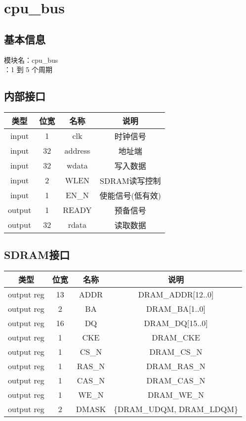 \section{cpu\_bus}
\subsection{基本信息}
模块名：cpu\_bus\\
：1 到 5 个周期
\subsection{内部接口}
\begin{tabular}{|c|c|c|c|}
    \hline
    类型        &   位宽    &   名称    &   说明\\\hline
    input       &   1      &    clk     &   时钟信号\\\hline
    input       &   32     &    address &   地址端\\\hline
    input       &   32      &   wdata   &   写入数据\\\hline
    input       &   2       &   WLEN    &   SDRAM读写控制\\\hline
    input       &   1       &   EN\_N   &   使能信号(低有效)\\\hline
    output      &   1       &   READY   &   预备信号\\\hline
    output      &   32      &   rdata   &   读取数据\\\hline
\end{tabular}
\subsection{SDRAM接口}
\begin{tabular}{|c|c|c|c|}
    \hline
    类型        &   位宽    &   名称    &   说明\\\hline
    output reg  &   13     &    ADDR   &    DRAM\_ADDR[12..0]\\\hline
    output reg  &   2       &   BA      &   DRAM\_BA[1..0]\\\hline
    output reg  &   16      &   DQ      &   DRAM\_DQ[15..0]\\\hline
    output reg  &   1       &   CKE     &   DRAM\_CKE\\\hline
    output reg  &   1       &   CS\_N     &   DRAM\_CS\_N\\\hline
    output reg  &   1       &   RAS\_N     &   DRAM\_RAS\_N\\\hline
    output reg  &   1       &   CAS\_N     &   DRAM\_CAS\_N\\\hline
    output reg  &   1       &   WE\_N     &   DRAM\_WE\_N\\\hline
    output reg  &   2       &   DMASK     &  \{DRAM\_UDQM, DRAM\_LDQM\}\\\hline
\end{tabular}
